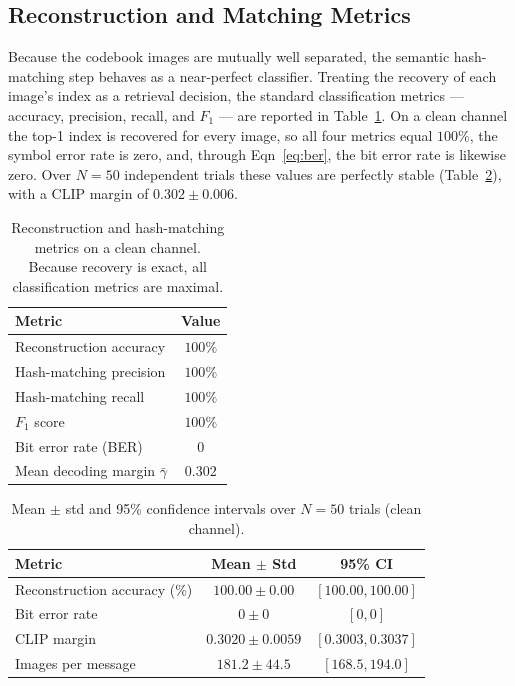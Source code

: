 \documentclass[11pt]{article}
\begin{document}
\subsection{Reconstruction and Matching Metrics}\label{sec:metrics}
Because the codebook images are mutually well separated, the semantic
hash-matching step behaves as a near-perfect classifier. Treating the recovery of
each image's index as a retrieval decision, the standard classification metrics
--- accuracy, precision, recall, and $F_1$ --- are reported in
Table~\ref{tab:prf1}. On a clean channel the top-1 index is recovered for every
image, so all four metrics equal $100\%$, the symbol error rate is zero, and,
through Eqn~\eqref{eq:ber}, the bit error rate is likewise zero. Over $N{=}50$
independent trials these values are perfectly stable (Table~\ref{tab:stats}), with a
CLIP margin of $0.302\pm0.006$.

\begin{table}[H]
\centering
\caption{Reconstruction and hash-matching metrics on a clean channel. Because recovery is exact, all classification metrics are maximal.}\label{tab:prf1}
\begin{tabular}{@{}lc@{}}
\toprule
Metric & Value \\
\midrule
Reconstruction accuracy & $100\%$ \\
Hash-matching precision  & $100\%$ \\
Hash-matching recall     & $100\%$ \\
$F_1$ score              & $100\%$ \\
Bit error rate (BER)     & $0$ \\
Mean decoding margin $\bar\gamma$ & $0.302$ \\
\bottomrule
\end{tabular}
\end{table}

\begin{table}[H]
\centering
\caption{Mean $\pm$ std and 95\% confidence intervals over $N{=}50$ trials (clean channel).}\label{tab:stats}
\begin{tabular}{@{}lcc@{}}
\toprule
Metric & Mean $\pm$ Std & 95\% CI \\
\midrule
Reconstruction accuracy (\%) & $100.00\pm0.00$ & $[100.00,100.00]$ \\
Bit error rate               & $0\pm0$         & $[0,0]$ \\
CLIP margin                  & $0.3020\pm0.0059$ & $[0.3003,0.3037]$ \\
Images per message           & $181.2\pm44.5$  & $[168.5,194.0]$ \\
\bottomrule
\end{tabular}
\end{table}
\end{document}
